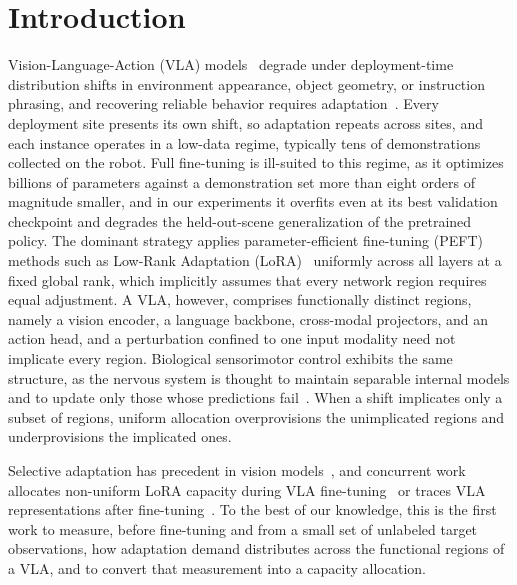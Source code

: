 \section{Introduction}
\label{sec:introduction}

Vision-Language-Action (VLA) models~\cite{Kim2024OpenVLA, OctoModelTeam2024} degrade under deployment-time distribution shifts in environment appearance, object geometry, or instruction phrasing, and recovering reliable behavior requires adaptation~\cite{Ferchau2026VLALoRA}.
Every deployment site presents its own shift, so adaptation repeats across sites, and each instance operates in a low-data regime, typically tens of demonstrations collected on the robot.
Full fine-tuning is ill-suited to this regime, as it optimizes billions of parameters against a demonstration set more than eight orders of magnitude smaller, and in our experiments it overfits even at its best validation checkpoint and degrades the held-out-scene generalization of the pretrained policy.
The dominant strategy applies parameter-efficient fine-tuning (PEFT) methods such as Low-Rank Adaptation (LoRA)~\cite{Hu2022LoRA} uniformly across all layers at a fixed global rank, which implicitly assumes that every network region requires equal adjustment.
A VLA, however, comprises functionally distinct regions, namely a vision encoder, a language backbone, cross-modal projectors, and an action head, and a perturbation confined to one input modality need not implicate every region.
Biological sensorimotor control exhibits the same structure, as the nervous system is thought to maintain separable internal models and to update only those whose predictions fail~\cite{Wolpert1998MOSAIC}.
When a shift implicates only a subset of regions, uniform allocation overprovisions the unimplicated regions and underprovisions the implicated ones.



Selective adaptation has precedent in vision models~\cite{Lee2023Surgical, He2023SPT, Zhang2023AdaLoRA}, and concurrent work allocates non-uniform LoRA capacity during VLA fine-tuning~\cite{Kim2026LoRASP} or traces VLA representations after fine-tuning~\cite{Shi2026VLATrace}.
To the best of our knowledge, this is the first work to measure, before fine-tuning and from a small set of unlabeled target observations, how adaptation demand distributes across the functional regions of a VLA, and to convert that measurement into a capacity allocation.

